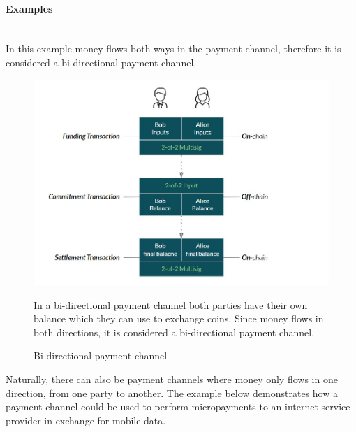 \documentclass[a4paper, 12pt]{report}
\begin{document}
\paragraph{Examples} \hspace{0pt} \\
In this example money flows both ways in the payment channel, therefore it is considered a bi-directional payment channel.

\begin{figure}[H]
	\centering
	\includegraphics[width=13cm]{06_Bidirectional_Channel}
	\caption{Bi-directional payment channel}
	\medskip
	\small In a bi-directional payment channel both parties have their own balance which they can use to exchange coins. Since money flows in both directions, it is considered a bi-directional payment channel.
	\label{fig:06_Bidirectional_Channel}
\end{figure}

\par Naturally, there can also be payment channels where money only flows in one direction, from one party to another. The example below demonstrates how a payment channel could be used to perform micropayments to an internet service provider in exchange for mobile data.
\end{document}

